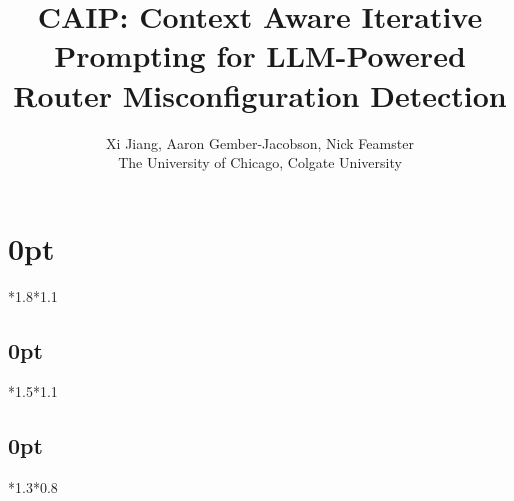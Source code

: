\usepackage{ifluatex}

\usepackage{outlines}
\newtheorem{insight}{Insight}

\captionsetup[figure]{belowskip=0pt}
\captionsetup[figure]{skip=0pt}
\captionsetup[table]{belowskip=0pt}
\captionsetup[table]{skip=0pt}


\usepackage[compact]{titlesec}
\renewcommand{\paragraph}[1]{\noindent\textbf{#1}}
\setlength{\textfloatsep}{5pt plus 0pt minus 2.0pt}
\titlespacing\section{0pt}{*1.8}{*1.1}
\titlespacing\subsection{0pt}{*1.5}{*1.1}
\titlespacing\subsection{0pt}{*1.3}{*0.8}
\usepackage{booktabs}



\newcommand*{\affmark}[1][*]{\textsuperscript{#1}}
\newcommand*{\affaddr}[1]{#1}

\title{CAIP: Context Aware Iterative Prompting for LLM-Powered Router Misconfiguration Detection}



\author{Xi Jiang, Aaron Gember-Jacobson, Nick Feamster \\
The University of Chicago, Colgate University}
\newcommand{\eg}{{\it e.g.}}
\newcommand{\ie}{{\it i.e.}}
\newcommand{\etal}{{\it et al.}}
\newcommand{\sysname}{{CAIP}}



